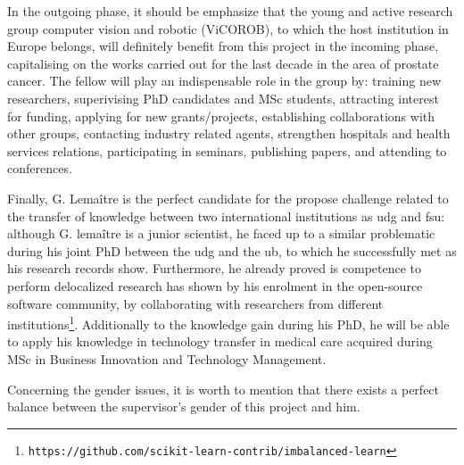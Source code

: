 In the outgoing phase, it should be emphasize that the young and active research group computer vision and robotic (ViCOROB), to which the host institution in Europe belongs, will definitely benefit from this project in the incoming phase, capitalising on the works carried out for the last decade in the area of prostate cancer. The fellow will play an indispensable role in the group by: training new researchers, superivising PhD candidates and MSc students, attracting interest for funding, applying for new grants/projects,  establishing collaborations with other groups, contacting industry related agents, strengthen hospitals and health services relations, participating in seminars, publishing papers, and attending to conferences.

Finally, G. Lema\^itre is the perfect candidate for the propose challenge related to the transfer of knowledge between two international institutions as \ac{udg} and \ac{fsu}: although G. lema\^itre is a junior scientist, he faced up to a similar problematic during his joint PhD between the \ac{udg} and the \ac{ub}, to which he successfully met as his research records show.
Furthermore, he already proved is competence to perform delocalized research has shown by his enrolment in the open-source software community, by collaborating with researchers from different institutions\footnote{\texttt{https://github.com/scikit-learn-contrib/imbalanced-learn}}.
Additionally to the knowledge gain during his PhD, he will be able to apply his knowledge in technology transfer in medical care acquired during MSc in Business Innovation and Technology Management.

Concerning the gender issues, it is worth to mention that there exists a perfect balance between the supervisor's gender of this project and him.



